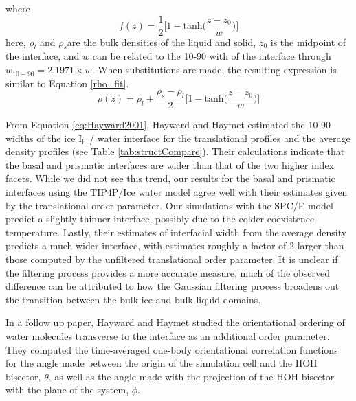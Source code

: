 where
\begin{equation}
f(z) = \frac{1}{2}\Bigg[1-\mathrm{tanh}\Big(\frac{z-z_{0}}{w}\Big)\Bigg]
\end{equation}
here, $\rho_{l}$ and $\rho_{s}$are the bulk densities of the liquid
and solid, $z_0$ is the midpoint of the interface, and $w$ can be
related to the 10-90 with of the interface through
$w_{10-90} = 2.1971\times w$. When substitutions are made, the
resulting expression is similar to Equation \eqref{rho_fit}.
\begin{equation}\label{eq:Hayward2001}
\rho (z) = \rho_{l} + \frac{\rho_{s} -
  \rho_{l}}{2}\Bigg[1-\mathrm{tanh}\bigg(\frac{z-z_0}{w}\bigg)\Bigg]
\end{equation}

From Equation \eqref{eq:Hayward2001}, Hayward and Haymet estimated the
10-90 widths of the ice I$_\mathrm{h}$ / water interface for the
translational profiles and the average density profiles (see Table
\ref{tab:structCompare}). Their calculations indicate that the basal
and prismatic interfaces are wider than that of the two higher index
facets. While we did not see this trend, our results for the basal and
prismatic interfaces using the TIP4P/Ice water model agree well with
their estimates given by the translational order parameter. Our
simulations with the SPC/E model predict a slightly thinner interface,
possibly due to the colder coexistence temperature. Lastly, their
estimates of interfacial width from the average density predicts a
much wider interface, with estimates roughly a factor of 2 larger than
those computed by the unfiltered translational order parameter. It is
unclear if the filtering process provides a more accurate measure,
much of the observed difference can be attributed to how the Gaussian
filtering process broadens out the transition between the bulk ice and
bulk liquid domains.

In a follow up paper, Hayward and Haymet studied the orientational
ordering of water molecules transverse to the interface as an
additional order parameter.\cite{Hayward2002} They computed the
time-averaged one-body orientational correlation functions for the
angle made between the origin of the simulation cell and the HOH
bisector, $\theta$, as well as the angle made with the projection of
the HOH bisector with the plane of the system, $\phi$.





